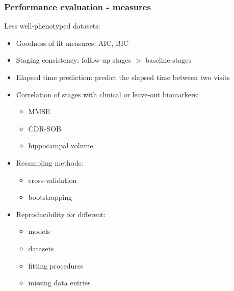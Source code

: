 \documentclass[10pt,xcolor=table]{beamer}
\begin{document}
\begin{frame}
\frametitle{Performance evaluation - measures}

Less well-phenotyped datasets:
\begin{itemize}
 \item \textcolor{parCol}{Goodness of fit measures: AIC, BIC}
 \item \textcolor{stCol}{Staging consistency: follow-up stages $>$ baseline stages}
 \item \textcolor{stCol}{Elapsed time prediction: predict the elapsed time between two visits}
 \item \textcolor{stCol}{Correlation of stages with clinical or leave-out biomarkers:}
   \begin{itemize}
   \item MMSE
   \item CDR-SOB
   \item hippocampal volume
  \end{itemize}
 \item \textcolor{bothCol}{Resampling methods:}
  \begin{itemize}
   \item cross-validation
   \item bootstrapping
  \end{itemize}
 \item \textcolor{bothCol}{Reproducibility for different}: 
 \begin{itemize}
   \item models
   \item datasets
   \item fitting procedures
   \item missing data entries
 \end{itemize}
  
\end{itemize}

\end{frame}

\fontsize{6pt}{7.2}\selectfont
{}
\end{document}
